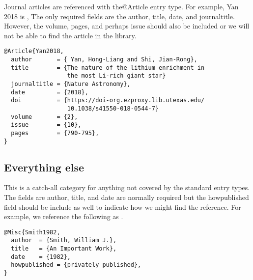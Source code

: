 Journal articles are referenced with the{\ttfamily @Article} entry
type.  For example, Yan 2018 is \cite{Yan2018}, The only required
fields are the {\ttfamily author}, {\ttfamily title}, {\ttfamily
  date}, and {\ttfamily journaltitle}.  However, the {\ttfamily
  volume}, {\ttfamily pages}, and perhaps {\ttfamily issue} should
also be included or we will not be able to find the article in the
library.

\begin{verbatim}
@Article{Yan2018,
  author       = { Yan, Hong-Liang and Shi, Jian-Rong},
  title        = {The nature of the lithium enrichment in
                  the most Li-rich giant star}
  journaltitle = {Nature Astronomy},
  date         = {2018},
  doi          = {https://doi-org.ezproxy.lib.utexas.edu/
                  10.1038/s41550-018-0544-7}
  volume       = {2},
  issue        = {10},
  pages        = {790-795},
}

\end{verbatim}

\subsection{Everything else}
This is a catch-all category for anything not covered by the standard
entry types.  The fields are {\ttfamily author}, {\ttfamily title},
and {\ttfamily date} are normally required but the {\ttfamily
  howpublished} field should be include as well to indicate how
we might find the reference. For example, we reference the following
as \cite{Smith1982}.

\begin{verbatim}
@Misc{Smith1982,
  author  = {Smith, William J.},
  title   = {An Important Work},
  date    = {1982},
  howpublished = {privately published},
}
\end{verbatim}
